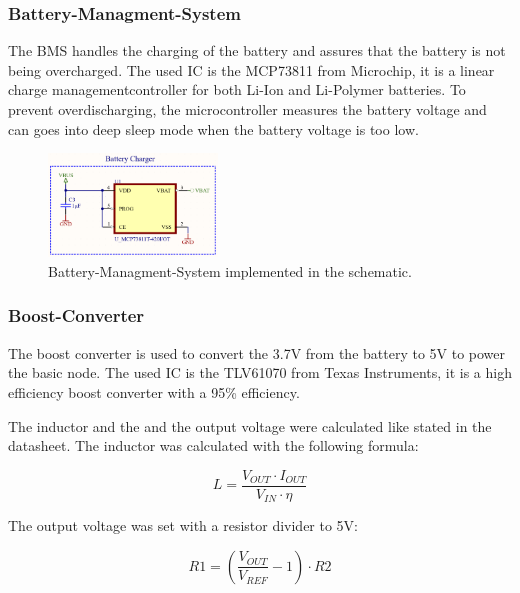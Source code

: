     \subsubsection{Battery-Managment-System}

        The BMS handles the charging of the battery and assures that the battery is not
        being overcharged. The used IC is the MCP73811 from Microchip, it is a linear 
        charge managementcontroller for both Li-Ion and Li-Polymer batteries. 
        To prevent overdischarging, the microcontroller measures the battery voltage
        and can goes into deep sleep mode when the battery voltage is too low.

        \begin{figure}[H]
        \centering
        \includegraphics[width=0.4\textwidth]{assets/HW/Battery-ChargerIC.png}
        \caption{Battery-Managment-System implemented in the schematic.}
        \end{figure}

    \subsubsection{Boost-Converter}

        The boost converter is used to convert the 3.7V from the battery to 5V to power the 
        basic node. The used IC is the TLV61070 from Texas Instruments, it is a high efficiency
        boost converter with a 95\% efficiency.

        The inductor and the and the output voltage were calculated like stated in the
        datasheet\cite{noauthor_tlv61070apdf_2022}. The inductor was calculated with the following formula:
        
        \begin{equation}
            L = \frac{V_{OUT} \cdot I_{OUT}}{V_{IN} \cdot \eta}
        \end{equation}  

        The output voltage was set with a resistor divider to 5V:

        \begin{equation}
            R1 = ( \frac{V_{OUT}}{V_{REF}} - 1) \cdot R2
        \end{equation}

